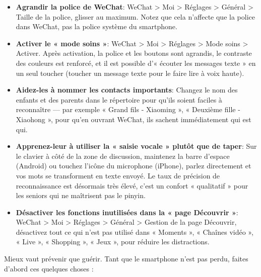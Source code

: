 \begin{itemize}
  \item \textbf{Agrandir la police de WeChat}: WeChat > Moi > Réglages > Général > Taille de la police, glisser au maximum. Notez que cela n'affecte que la police dans WeChat, pas la police système du smartphone.
  \item \textbf{Activer le « mode soins »}: WeChat > Moi > Réglages > Mode soins > Activer. Après activation, la police et les boutons sont agrandis, le contraste des couleurs est renforcé, et il est possible d'« écouter les messages texte » en un seul toucher (toucher un message texte pour le faire lire à voix haute).
  \item \textbf{Aidez-les à nommer les contacts importants}: Changez le nom des enfants et des parents dans le répertoire pour qu'ils soient faciles à reconnaître — par exemple « Grand fils - Xiaoming », « Deuxième fille - Xiaohong », pour qu'en ouvrant WeChat, ils sachent immédiatement qui est qui.
  \item \textbf{Apprenez-leur à utiliser la « saisie vocale » plutôt que de taper}: Sur le clavier à côté de la zone de discussion, maintenez la barre d'espace (Android) ou touchez l'icône du microphone (iPhone), parlez directement et vos mots se transforment en texte envoyé. Le taux de précision de reconnaissance est désormais très élevé, c'est un confort « qualitatif » pour les seniors qui ne maîtrisent pas le pinyin.
  \item \textbf{Désactiver les fonctions inutilisées dans la « page Découvrir »}: WeChat > Moi > Réglages > Général > Gestion de la page Découvrir, désactivez tout ce qui n'est pas utilisé dans « Moments », « Chaînes vidéo », « Live », « Shopping », « Jeux », pour réduire les distractions.
\end{itemize}


Mieux vaut prévenir que guérir. Tant que le smartphone n'est pas perdu, faites d'abord ces quelques choses :

